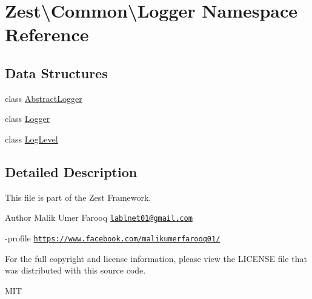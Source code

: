 \hypertarget{namespace_zest_1_1_common_1_1_logger}{}\section{Zest\textbackslash{}Common\textbackslash{}Logger Namespace Reference}
\label{namespace_zest_1_1_common_1_1_logger}
\subsection*{Data Structures}
\begin{DoxyCompactItemize}
\item 
class \mbox{\hyperlink{class_zest_1_1_common_1_1_logger_1_1_abstract_logger}{Abstract\+Logger}}
\item 
class \mbox{\hyperlink{class_zest_1_1_common_1_1_logger_1_1_logger}{Logger}}
\item 
class \mbox{\hyperlink{class_zest_1_1_common_1_1_logger_1_1_log_level}{Log\+Level}}
\end{DoxyCompactItemize}


\subsection{Detailed Description}
This file is part of the Zest Framework.

\begin{DoxyAuthor}{Author}
Malik Umer Farooq \href{mailto:lablnet01@gmail.com}{\tt lablnet01@gmail.\+com} 

-\/profile \href{https://www.facebook.com/malikumerfarooq01/}{\tt https\+://www.\+facebook.\+com/malikumerfarooq01/}
\end{DoxyAuthor}
For the full copyright and license information, please view the L\+I\+C\+E\+N\+SE file that was distributed with this source code.

M\+IT 